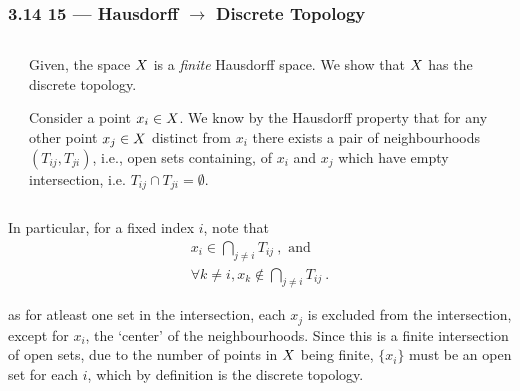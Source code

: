 \begin{frame}
    \frametitle{3.14 15 --- Hausdorff \(\rightarrow\) Discrete Topology}

    \begin{columns}
        \begin{column}{0.3\textwidth}
            \scalebox{0.6}{}            
        \end{column}
        \begin{column}{0.7\textwidth}
            Given, the space \(X\) is a \emph{finite} Hausdorff space. We
            show that \(X\) has the discrete topology.

            Consider a point \(x_i \in X\). We know by the Hausdorff
            property that for any other point \(x_j \in X\) distinct from
            \(x_i\) there exists a pair of neighbourhoods \((T_{ij}, T_{ji})\),
            i.e., open sets containing, of \(x_i\) and \(x_j\) which have empty
            intersection, i.e. \(T_{ij} \cap T_{ji} = \emptyset\).
        \end{column}
    \end{columns}   

\end{frame}

\begin{frame}

    In particular, for a fixed index \(i\), note that 
    \begin{gather*}
        x_i \in \bigcap_{j\not = i} T_{ij}~, \text{ and}\\ 
        \forall k \not = i, x_k \not \in \bigcap_{j\not = i} T_{ij}~.
    \end{gather*}

    as for atleast one set in the intersection, each \(x_j\) is excluded
    from the intersection, except for \(x_i\), the `center' of the
    neighbourhoods. Since this is a finite intersection of open sets,
    due to the number of points in \(X\) being finite, \(\{x_i\}\)
    must be an open set for each \(i\), which by definition is the
    discrete topology.

\end{frame}


